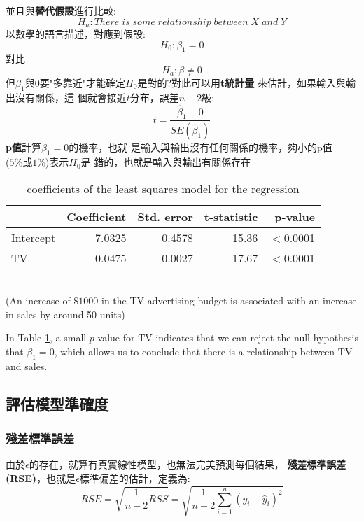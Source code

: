 \documentclass{report} %
\begin{document}
      並且與{\bf 替代假設}進行比較:
      \begin{equation}
        H_a : There\;is\;some\;relationship\;between\;X\;and\;Y
      \end{equation}
      以數學的語言描述，對應到假設:
      \[
        H_0 : \beta_1 = 0
      \]
      對比
      \[
        H_a : \beta \neq 0
      \]
      但$\beta_1$與$0$要"多靠近"才能確定$H_0$是對的?對此可以用{\bf t統計量}
        來估計，如果輸入與輸出沒有關係，這
        個就會接近$t$分布，誤差$n - 2$級:
      \begin{equation}
        t = \frac{\hat{\beta}_1 - 0}{SE(\hat{\beta}_1)}
      \end{equation}
      {\bf p值}計算$\beta_1 = 0$的機率，也就
        是輸入與輸出沒有任何關係的機率，夠小的p值\\($5\%$或$1\%$)表示$H_0$是
        錯的，也就是輸入與輸出有關係存在 \\
      \begin{table}[htbp]
        \caption{\label{tb:advertising}coefficients of the least
          squares model for the regression}
        \centering
        \begin{tabular}{l|rrrr}
          \hline
            & Coefficient &  Std. error &  t-statistic & p-value
          \tabularnewline
          \hline
          Intercept & 7.0325 & 0.4578 & 15.36 & $<$0.0001
          \tabularnewline
                 TV & 0.0475 & 0.0027 & 17.67 & $<$0.0001
          \tabularnewline
          \hline
        \end{tabular}\\
        (An increase of $\$1000$ in the TV advertising budget is
          associated with an increase in sales by around 50 units)
      \end{table}
      In Table \ref{tb:advertising}, a small $p$-value for TV
        indicates that we can reject the null hypothesis that
        $\beta_1 = 0$, which allows us to conclude that there is a
        relationship between TV and sales.
    \subsection{評估模型準確度}
      \subsubsection{殘差標準誤差}
        由於$\epsilon$的存在，就算有真實線性模型，也無法完美預測每個結果，{\bf
          殘差標準誤差(RSE)}，也就是$\epsilon$標準偏差的估計，定義為:
        \begin{equation}
          RSE = \sqrt{\frac{1}{n - 2}RSS} = \sqrt{\frac{1}{n -
            2}\sum_{i = 1} ^ {n}(y_i - \hat{y}_i) ^ 2}
        \end{equation}
\end{document}
